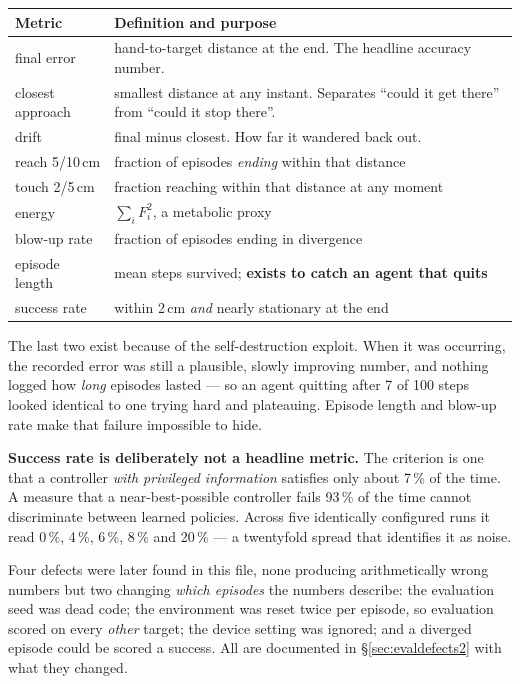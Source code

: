 \begin{center}
\begin{tabular}{@{} L{3.4cm} L{10.6cm} @{}}
\toprule
\textbf{Metric} & \textbf{Definition and purpose} \\
\midrule
final error & hand-to-target distance at the end. The headline accuracy number. \\
closest approach & smallest distance at any instant. Separates ``could it get there'' from ``could it stop there''. \\
drift & final minus closest. How far it wandered back out. \\
reach 5/10\,cm & fraction of episodes \emph{ending} within that distance \\
touch 2/5\,cm & fraction reaching within that distance at any moment \\
energy & $\sum_i F_i^2$, a metabolic proxy \\
blow-up rate & fraction of episodes ending in divergence \\
episode length & mean steps survived; \textbf{exists to catch an agent that quits} \\
success rate & within 2\,cm \emph{and} nearly stationary at the end \\
\bottomrule
\end{tabular}
\end{center}

\begin{why}
The last two exist because of the self-destruction exploit. When it was
occurring, the recorded error was still a plausible, slowly improving number, and
nothing logged how \emph{long} episodes lasted --- so an agent quitting after 7
of 100 steps looked identical to one trying hard and plateauing. Episode length
and blow-up rate make that failure impossible to hide.

\textbf{Success rate is deliberately not a headline metric.} The criterion is one
that a controller \emph{with privileged information} satisfies only about 7\,\%
of the time. A measure that a near-best-possible controller fails 93\,\% of the
time cannot discriminate between learned policies. Across five identically
configured runs it read 0\,\%, 4\,\%, 6\,\%, 8\,\% and 20\,\% --- a twentyfold
spread that identifies it as noise.
\end{why}

\begin{trap}
Four defects were later found in this file, none producing arithmetically wrong
numbers but two changing \emph{which episodes} the numbers describe:
the evaluation seed was dead code; the environment was reset twice per episode,
so evaluation scored on every \emph{other} target; the device setting was
ignored; and a diverged episode could be scored a success. All are documented in
\S\ref{sec:evaldefects2} with what they changed.
\end{trap}

